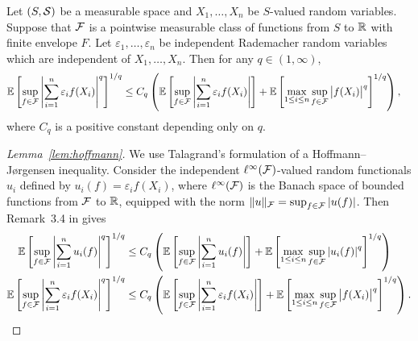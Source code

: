 \begin{lemma}
  \label{lem:hoffmann}

  Let $(S, \mathcal{S})$ be a measurable space
  and $X_1, \ldots, X_n$
  be $S$-valued random variables.
  Suppose that
  $\mathcal{F}$ is a pointwise measurable class of functions from $S$ to $\mathbb{R}$
  with finite envelope $F$.
  Let $\varepsilon_1, \ldots, \varepsilon_n$
  be independent Rademacher random variables
  which are independent of $X_1, \ldots, X_n$.
  Then for any $q \in (1, \infty)$,
  \begin{align*}
    \mathbb{E} \left[
      \sup_{f \in \mathcal{F}}
      \left|
      \sum_{i=1}^n
      \varepsilon_i
      f(X_i)
      \right|
      ^q
    \right]
    ^{1/q}
    &\leq
    C_q
    \left(
      \mathbb{E} \left[
        \sup_{f \in \mathcal{F}}
        \left|
        \sum_{i=1}^n
        \varepsilon_i
        f(X_i)
        \right|
      \right]
      +
      \mathbb{E} \left[
        \max_{1 \leq i \leq n}
        \sup_{f \in \mathcal{F}}
        \big| f(X_i) \big|^q
      \right]^{1/q}
    \right),
  \end{align*}
  where $C_q$ is a positive constant depending only on $q$.

\end{lemma}

\begin{proof}[Lemma~\ref{lem:hoffmann}]

  We use Talagrand's formulation of
  a Hoffmann--J{\o}rgensen inequality.
  Consider the
  independent
  $\ell^\infty(\mathcal{F})$-valued
  random functionals $u_i$ defined by
  $u_i(f) = \varepsilon_i f(X_i)$,
  where $\ell^\infty(\mathcal{F})$
  is the Banach space of bounded functions from
  $\mathcal{F}$ to $\mathbb{R}$,
  equipped with the norm
  $\|u\|_{\mathcal{F}} = \sup_{f \in \mathcal{F}} |u(f)|$.
  Then Remark~3.4 in \citet{kwapien1991hypercontraction} gives
  \begin{align*}
    \mathbb{E} \left[
      \sup_{f \in \mathcal{F}}
      \left|
      \sum_{i=1}^n
      u_i(f)
      \right|
      ^q
    \right]
    ^{1/q}
    &\leq
    C_q
    \left(
      \mathbb{E} \left[
        \sup_{f \in \mathcal{F}}
        \left|
        \sum_{i=1}^n
        u_i(f)
        \right|
      \right]
      +
      \mathbb{E} \left[
        \max_{1 \leq i \leq n}
        \sup_{f \in \mathcal{F}}
        \left|
        u_i(f)
        \right|^q
      \right]^{1/q}
    \right) \\
    \mathbb{E} \left[
      \sup_{f \in \mathcal{F}}
      \left|
      \sum_{i=1}^n
      \varepsilon_i
      f(X_i)
      \right|
      ^q
    \right]
    ^{1/q}
    &\leq
    C_q
    \left(
      \mathbb{E} \left[
        \sup_{f \in \mathcal{F}}
        \left|
        \sum_{i=1}^n
        \varepsilon_i
        f(X_i)
        \right|
      \right]
      +
      \mathbb{E} \left[
        \max_{1 \leq i \leq n}
        \sup_{f \in \mathcal{F}}
        \big| f(X_i) \big|^q
      \right]^{1/q}
    \right).
  \end{align*}
\end{proof}


